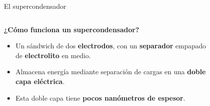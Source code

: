 \documentclass[aspectratio=169]{beamer}
\begin{document}
	\begin{frame}{El supercondensador}
		\begin{columns}
			\begin{column}{0.5\textwidth}
				\only<1->\textbf{¿Cómo funciona un supercondensador?}
				\begin{itemize}
					\item<2-> Un sándwich de dos \textbf{electrodos}, con un \textbf{separador} empapado de \textbf{electrolito} en medio.
					\item<3-> Almacena energía mediante separación de cargas en una \textbf{doble capa eléctrica}.
					\item<4-> Esta doble capa tiene \textbf{pocos nanómetros de espesor}.
				\end{itemize}
			\end{column}
			\begin{column}{0.5\textwidth}
				\begin{figure}[h!]
					\centering
\end{figure}
\end{column}
\end{columns}
\end{frame}
\end{document}
